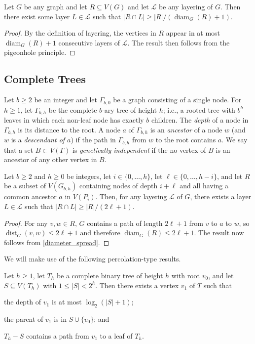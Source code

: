 \documentclass{patmorin}
\newcommand{\defin}[1]{\emph{\color{brightmaroon}#1}}
\DeclareMathOperator{\dist}{dist}
\DeclareMathOperator{\diam}{diam}
\begin{document}
\begin{obs}\label{diameter_spread}
  Let $G$ be any graph and let $R\subseteq V(G)$ and let $\mathcal{L}$ be any layering of $G$.  Then there exist some layer $L\in\mathcal{L}$ such that $|R\cap L|\ge |R|/(\diam_G(R)+1)$.
\end{obs}

\begin{proof}
  By the definition of layering, the vertices in $R$ appear in at most $\diam_G(R)+1$ consecutive layers of $\mathcal{L}$. The result then follows from the pigeonhole principle.
\end{proof}

\subsection{Complete Trees}

Let $b\ge 2$ be an integer and let $\Gamma_{b,0}$ be a graph consisting of a single node.  For $h\ge 1$, let $\Gamma_{b,h}$ be the complete $b$-ary tree of height $h$; i.e., a rooted tree with $b^h$ leaves in which each non-leaf node has exactly $b$ children.  The \defin{depth} of a node in $\Gamma_{b,h}$ is its distance to the root.  A node $a$ of $\Gamma_{b,h}$ is an \defin{ancestor} of a node $w$ (and $w$ is a \defin{descendant of $a$}) if the path in $\Gamma_{b,h}$ from $w$ to the root contains $a$. We say that a set $B\subset V(\Gamma)$ is \defin{genetically independent} if the no vertex of $B$ is an ancestor of any other vertex in $B$.  

\begin{obs}\label{ancestor_spread}
  Let $b\ge 2$ and $h\ge 0$ be integers, let $i\in\{0,\ldots,h\}$, let $\ell\in\{0,\ldots,h-i\}$, and let $R$ be a subset of $V(G_{b,h})$ containing nodes of depth $i+\ell$ and all having a common ancestor $a$ in $V(P_i)$.  Then, for any layering $\mathcal{L}$ of $G$, there exists a layer $L\in\mathcal{L}$ such that $|R\cap L|\ge |R|/(2\ell+1)$. 
\end{obs}

\begin{proof}
  For any $v,w\in R$, $G$ contains a path of length $2\ell+1$ from $v$ to $a$ to $w$, so $\dist_G(v,w)\le 2\ell+1$ and therefore $\diam_G(R)\le 2\ell+1$. The result now follows from \cref{diameter_spread}.
\end{proof}

We will make use of the following percolation-type results. 

\begin{lem}\label{one_path}
  Let $h\ge 1$, let $T_h$ be a complete binary tree of height $h$ with root $v_0$, and let $S\subseteq V(T_h)$ with $1\le |S|< 2^h$. Then there exists a vertex $v_1$ of $T$ such that
  \begin{compactenum}[(i)]
    \item the depth of $v_1$ is at most $\log_2(|S|+1)$;
    \item the parent of $v_1$ is in $S\cup\{v_0\}$; and
    \item $T_h-S$ contains a path from $v_1$ to a leaf of $T_h$.
  \end{compactenum} 
\end{lem}
\end{document}
